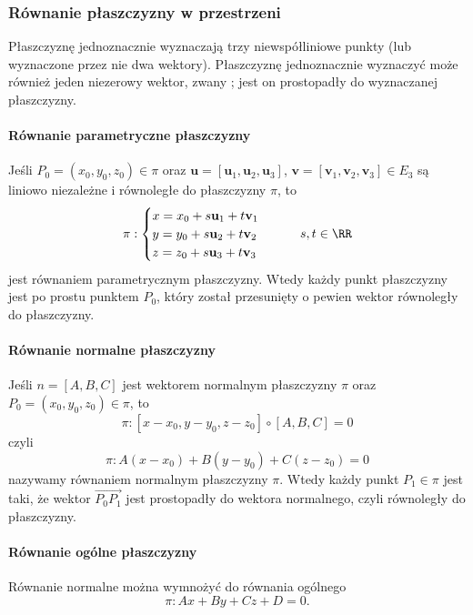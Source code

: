\subsubsection{Równanie płaszczyzny w przestrzeni}
Płaszczyznę jednoznacznie wyznaczają trzy niewspółliniowe punkty (lub wyznaczone przez nie dwa wektory). Płaszczyznę jednoznacznie wyznaczyć może również jeden niezerowy wektor, zwany ; jest on prostopadły do wyznaczanej płaszczyzny.

\paragraph{Równanie parametryczne płaszczyzny} Jeśli $P_0 = (x_0, y_0, z_0) \in \pi$ oraz $\mathbf{u} = [\mathbf{u}_1, \mathbf{u}_2, \mathbf{u}_3]$, $\mathbf{v} = [\mathbf{v}_1, \mathbf{v}_2, \mathbf{v}_3] \in E_3$ są liniowo niezależne i równoległe do płaszczyzny $\pi$, to
\begin{equation} \pi : \begin{cases}
    x = x_0 + s\mathbf{u}_1 + t\mathbf{v}_1 \\
    y = y_0 + s\mathbf{u}_2 + t\mathbf{v}_2 \\
    z = z_0 + s\mathbf{u}_3 + t\mathbf{v}_3
\end{cases} \qquad s, t \in \RR \end{equation}
jest równaniem parametrycznym płaszczyzny. Wtedy każdy punkt płaszczyzny jest po prostu punktem $P_0$, który został przesunięty o pewien wektor równoległy do płaszczyzny.

\paragraph{Równanie normalne płaszczyzny} Jeśli $n = [A, B, C]$ jest wektorem normalnym płaszczyzny $\pi$ oraz $P_0 = (x_0, y_0, z_0) \in \pi$, to
\[ \pi : [x - x_0, y - y_0, z - z_0] \circ [A, B, C] = 0 \]
czyli
\begin{equation}
    \pi : A(x - x_0) + B(y - y_0) + C(z - z_0) = 0
\end{equation}
nazywamy równaniem normalnym płaszczyzny $\pi$. Wtedy każdy punkt $P_1 \in \pi$ jest taki, że wektor $\overrightarrow{P_0P_1}$ jest prostopadły do wektora normalnego, czyli równoległy do płaszczyzny.

\paragraph{Równanie ogólne płaszczyzny} Równanie normalne można wymnożyć do równania ogólnego
\begin{equation}
    \pi : Ax + By + Cz + D = 0.
\end{equation}

